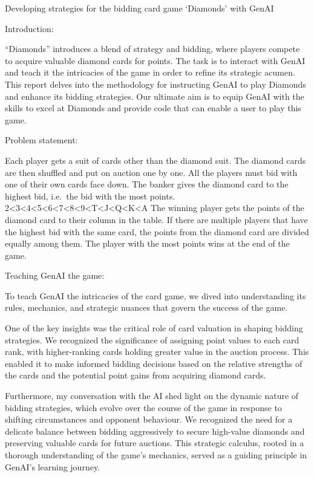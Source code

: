 \documentclass[
]{article}
\author{}
\date{}
\begin{document}
Developing strategies for the bidding card game `Diamonds' with GenAI

Introduction:

``Diamonds'' introduces a blend of strategy and bidding, where players
compete to acquire valuable diamond cards for points. The task is to
interact with GenAI and teach it the intricacies of the game in order to
refine its strategic acumen. This report delves into the methodology for
instructing GenAI to play Diamonds and enhance its bidding strategies.
Our ultimate aim is to equip GenAI with the skills to excel at Diamonds
and provide code that can enable a user to play this game.

Problem statement:

Each player gets a suit of cards other than the diamond suit. The
diamond cards are then shuffled and put on auction one by one. All the
players must bid with one of their own cards face down. The banker gives
the diamond card to the highest bid, i.e.~the bid with the most points.
2\textless3\textless4\textless5\textless6\textless7\textless8\textless9\textless T\textless J\textless Q\textless K\textless A
The winning player gets the points of the diamond card to their column
in the table. If there are multiple players that have the highest bid
with the same card, the points from the diamond card are divided equally
among them. The player with the most points wins at the end of the game.

Teaching GenAI the game:

To teach GenAI the intricacies of the card game, we dived into
understanding its rules, mechanics, and strategic nuances that govern
the success of the game.

One of the key insights was the critical role of card valuation in
shaping bidding strategies. We recognized the significance of assigning
point values to each card rank, with higher-ranking cards holding
greater value in the auction process. This enabled it to make informed
bidding decisions based on the relative strengths of the cards and the
potential point gains from acquiring diamond cards.

Furthermore, my conversation with the AI shed light on the dynamic
nature of bidding strategies, which evolve over the course of the game
in response to shifting circumstances and opponent behaviour. We
recognized the need for a delicate balance between bidding aggressively
to secure high-value diamonds and preserving valuable cards for future
auctions. This strategic calculus, rooted in a thorough understanding of
the game's mechanics, served as a guiding principle in GenAI's learning
journey.
\end{document}
